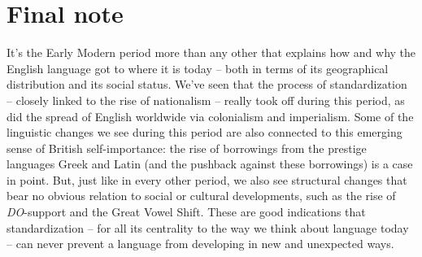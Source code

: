 \section{Final note}

It's the Early Modern period more than any other that explains how and why the English language got to where it is today -- both in terms of its geographical distribution and its social status. We've seen that the process of standardization -- closely linked to the rise of nationalism -- really took off during this period, as did the spread of English worldwide via colonialism and imperialism. Some of the linguistic changes we see during this period are also connected to this emerging sense of British self-importance: the rise of borrowings from the prestige languages Greek and Latin (and the pushback against these borrowings) is a case in point. But, just like in every other period, we also see structural changes that bear no obvious relation to social or cultural developments, such as the rise of \emph{DO}-support and the Great Vowel Shift. These are good indications that standardization -- for all its centrality to the way we think about language today -- can never prevent a language from developing in new and unexpected ways.



